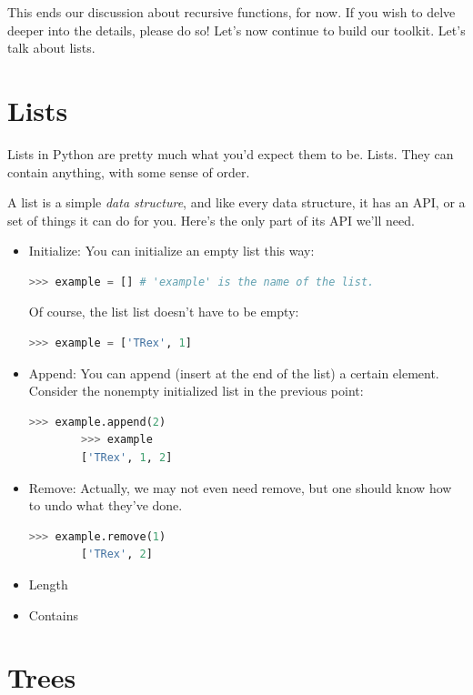 \documentclass{article}
\begin{document}
\noindent This ends our discussion about recursive functions, for now. If you wish to delve deeper into the details, please do so! Let's now continue to build our toolkit. Let's talk about lists. 

\section{Lists}

Lists in Python are pretty much what you'd expect them to be. Lists. They can contain anything, with some sense of order. 

A list is a simple \textit{data structure}, and like every data structure, it has an API, or a set of things it can do for you. Here's the only part of its API we'll need. 

\begin{itemize}
    \item Initialize: You can initialize an empty list this way: 
        \begin{lstlisting}[language=Python]
        >>> example = [] # 'example' is the name of the list.
        \end{lstlisting}
    Of course, the list list doesn't have to be empty:
        \begin{lstlisting}[language=Python]
        >>> example = ['TRex', 1]
        \end{lstlisting}
    \item Append: You can append (insert at the end of the list) a certain element. Consider the nonempty initialized list in the previous point: 
        \begin{lstlisting}[language=Python]
        >>> example.append(2)
        >>> example 
        ['TRex', 1, 2]
        \end{lstlisting}
    \item Remove: Actually, we may not even need remove, but one should know how to undo what they've done.
        \begin{lstlisting}[language=Python]
        >>> example.remove(1)
        ['TRex', 2]
        \end{lstlisting}
    \item Length
    \item Contains
\end{itemize}


\section{Trees}
\end{document}
